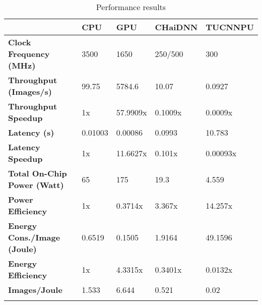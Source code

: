 \begin{table}[H]
	\caption{Performance results}
	\label{tab:Performance-results}
	\centering
	\begin{tabular}{lllll}
		\toprule
		& \textbf{CPU} & \textbf{GPU} & \textbf{CHaiDNN} & \textbf{TUCNNPU}\\
		\midrule
			\textbf{Clock Frequency (MHz)} & 3500 & 1650 & 250/500 & 300\\
			\textbf{Throughput (Images/s)} & 99.75 & 5784.6 & 10.07 & 0.0927\\
			\textbf{Throughput Speedup} & 1x & 57.9909x & 0.1009x & 0.0009x\\
			\textbf{Latency (s)} & 0.01003 & 0.00086 & 0.0993 & 10.783\\
			\textbf{Latency Speedup} & 1x & 11.6627x & 0.101x & 0.00093x\\
			\textbf{Total On-Chip Power (Watt)} & 65 & 175 & 19.3 & 4.559\\
			\textbf{Power Efficiency} & 1x & 0.3714x & 3.367x & 14.257x\\
			\textbf{Energy Cons./Image (Joule)} & 0.6519 & 0.1505 & 1.9164 & 49.1596\\
			\textbf{Energy Efficiency} & 1x & 4.3315x & 0.3401x & 0.0132x\\
			\textbf{Images/Joule} & 1.533 & 6.644 & 0.521 & 0.02\\
		\bottomrule\\
	\end{tabular}
\end{table}
